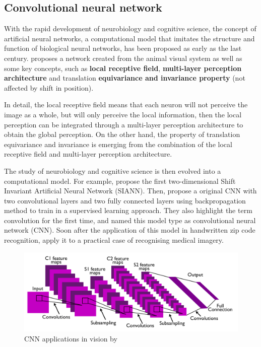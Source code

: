 \subsection{Convolutional neural network} %
With the rapid development of neurobiology and cognitive science, the concept of artificial neural networks, a computational model that imitates the structure and function of biological neural networks, has been proposed as early as the last century.
\citet{fukushima1980neocognitron} proposes a network created from the animal visual system as well as some key concepts, such as \textbf{local receptive field}, \textbf{multi-layer perception architecture} and translation \textbf{equivariance and invariance property} (not affected by shift in position).

In detail, the local receptive field means that each neuron will not perceive the image as a whole, but will only perceive the local information, then the local perception can be integrated through a multi-layer perception architecture to obtain the global perception.
On the other hand, the property of translation equivariance and invariance is emerging from the combination of the local receptive field and multi-layer perception architecture.

The study of neurobiology and cognitive science is then evolved into a computational model. For example, \citet{zhang1988shift} propose the first two-dimensional Shift Invariant Artificial Neural Network (SIANN).
Then, \citet{lecun1989backpropagation} propose a original CNN with two convolutional layers and two fully connected layers using backpropagation method to train in a supervised learning approach.
They also highlight the term convolution for the first time, and named this model type as convolutional neural network (CNN).
Soon after the application of this model in handwritten zip code recognition, \citet{zhang1994computerized} apply it to a practical case of recognising medical imagery.

\begin{figure}[ht!]
    \centering
    \includegraphics[width=\textwidth]{literature/imgs/ext-lecun-cnn-arch.png}
    \caption{CNN applications in vision by \citet{lecun2010convolutional}}
    \label{fig:ext-lecun-cnn-arch}
\end{figure}

